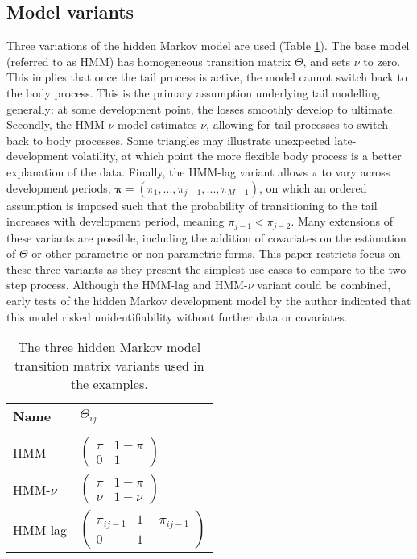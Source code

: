 \subsection{Model variants}
Three variations of the hidden Markov model are used (Table \ref{table:variants}). 
The base model (referred to as HMM) has homogeneous transition matrix $\Theta$,
and sets $\nu$ to zero. This implies that once the tail
process is active, the model cannot switch back to the
body process. This is the primary assumption underlying
tail modelling generally: at some development point, the 
losses smoothly develop to ultimate. Secondly, the HMM-$\nu$
model estimates $\nu$, allowing for tail processes to switch
back to body processes. Some triangles may illustrate
unexpected late-development volatility, at which point
the more flexible body process is a better explanation
of the data. Finally, the HMM-lag variant allows $\pi$
to vary across development periods, $\bm{\pi} = (\pi_{1}, 
..., \pi_{j - 1}, ..., \pi_{M - 1})$, on which 
an ordered assumption is imposed such that the probability
of transitioning to the tail increases with development period,
meaning $\pi_{j - 1} < \pi_{j - 2}$.
Many extensions of these variants are possible, including
the addition of covariates on the estimation of
$\Theta$ or other parametric or non-parametric
forms. This paper restricts focus on these three
variants as they present the simplest use cases
to compare to the two-step process. Although
the HMM-lag and HMM-$\nu$ variant could be combined,
early tests of the hidden Markov development model
by the author indicated that this model risked unidentifiability
without further data or covariates.

\begin{table}
    \centering
    \begin{tabular}{p{3cm}|p{3cm}}
        Name & $\Theta_{ij}$ \\
        \hline\\
        HMM & $\begin{pmatrix} \pi & 1 - \pi \\ 0 & 1 \end{pmatrix}$ \\
        HMM-$\nu$ & $\begin{pmatrix} \pi & 1 - \pi \\ \nu & 1 - \nu \end{pmatrix}$\\
        HMM-lag & $\begin{pmatrix} \pi_{ij-1} & 1 - \pi_{ij-1} \\ 0 & 1 \end{pmatrix}$\\
    \end{tabular}
    \caption{
        The three hidden Markov model transition matrix variants
        used in the examples.
    }
    \label{table:variants}
\end{table}

